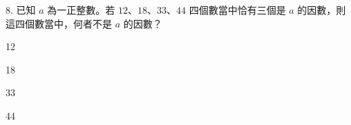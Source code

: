 \documentclass[12pt]{article}
\begin{document}
\begin{problem}
  \item[8.] 已知 $a$ 為一正整數。若 $12$、$18$、$33$、$44$ 四個數當中恰有三個是 $a$ 的因數，則這四個數當中，何者不是 $a$ 的因數？
  \begin{choices}
    \item 12
    \item 18
    \item 33
    \item 44
  \end{choices}
\end{problem}
\end{document}
